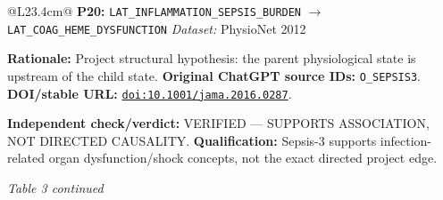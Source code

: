 \begin{tabular}{@{}L{23.4cm}@{}}
\addlinespace[2pt]
\midrule
\textbf{P20:} \nolinkurl{LAT_INFLAMMATION_SEPSIS_BURDEN} $\rightarrow$ \nolinkurl{LAT_COAG_HEME_DYSFUNCTION} \hfill \textit{Dataset:} PhysioNet 2012\par\textbf{Rationale:} Project structural hypothesis: the parent physiological state is upstream of the child state. \textbf{Original ChatGPT source IDs:} \nolinkurl{O_SEPSIS3}. \textbf{DOI/stable URL:} \href{https://doi.org/10.1001/jama.2016.0287}{\nolinkurl{doi:10.1001/jama.2016.0287}}.\par\textbf{Independent check/verdict:} VERIFIED --- SUPPORTS ASSOCIATION, NOT DIRECTED CAUSALITY. \textbf{Qualification:} Sepsis-3 supports infection-related organ dysfunction/shock concepts, not the exact directed project edge. \\
\addlinespace[2pt]
\midrule
\bottomrule
\end{tabular}
\clearpage
\textit{Table 3 continued}\par

